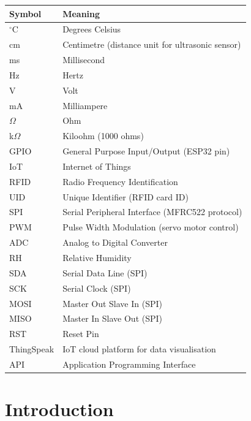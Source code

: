 \documentclass[12pt,a4paper]{report}
\begin{document}
\begin{tabular}{ll}
\toprule
\textbf{Symbol} & \textbf{Meaning} \\
\midrule
$^\circ$C & Degrees Celsius \\
cm & Centimetre (distance unit for ultrasonic sensor) \\
ms & Millisecond \\
Hz & Hertz \\
V & Volt \\
mA & Milliampere \\
$\Omega$ & Ohm \\
k$\Omega$ & Kiloohm (1000 ohms) \\
GPIO & General Purpose Input/Output (ESP32 pin) \\
IoT & Internet of Things \\
RFID & Radio Frequency Identification \\
UID & Unique Identifier (RFID card ID) \\
SPI & Serial Peripheral Interface (MFRC522 protocol) \\
PWM & Pulse Width Modulation (servo motor control) \\
ADC & Analog to Digital Converter \\
RH & Relative Humidity \\
SDA & Serial Data Line (SPI) \\
SCK & Serial Clock (SPI) \\
MOSI & Master Out Slave In (SPI) \\
MISO & Master In Slave Out (SPI) \\
RST & Reset Pin \\
ThingSpeak & IoT cloud platform for data visualisation \\
API & Application Programming Interface \\
\bottomrule
\end{tabular}

\newpage

\tableofcontents
\newpage

\listoffigures
\newpage

\listoftables
\newpage

\chapter{Introduction}
\end{document}

